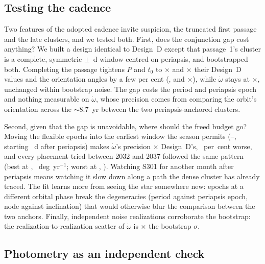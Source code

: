\documentclass{aastex701}
\begin{document}
\subsection{Testing the cadence}
\label{sec:cadencetests}

Two features of the adopted cadence invite suspicion, the truncated first passage and the late clusters, and we tested both. First, does the conjunction gap cost anything? We built a design identical to Design~D except that passage~1's cluster is a complete, symmetric $\pm$\campaignDenseHalfWidthDays{}~d window centred on periapsis, and bootstrapped both. Completing the passage tightens $P$ and $t_0$ to \cadenceCompleteRatioCapPYr{}$\times$ and \cadenceCompleteRatioTPeriYr{}$\times$ their Design~D values and the orientation angles by a few per cent (\cadenceCompleteRatioIDeg{}, \cadenceCompleteRatioCapOmegaDeg{} and \cadenceCompleteRatioOmegaDeg{}$\times$), while $\dot\omega$ stays at \cadenceCompleteRatioOmegaDot{}$\times$, unchanged within bootstrap noise. The gap costs the period and periapsis epoch and nothing measurable on $\dot\omega$, whose precision comes from comparing the orbit's orientation across the $\sim$8.7~yr between the two periapsis-anchored clusters.

Second, given that the gap is unavoidable, where should the freed budget go? Moving the \cadenceReallocateNMoved{} flexible epochs into the earliest window the season permits (\cadenceReallocateWindowStart{}--\cadenceReallocateWindowEnd{}, starting \conjunctionGapDaysAfterPeri{}~d after periapsis) makes $\dot\omega$'s precision \cadenceReallocateRatio{}$\times$ Design~D's, \cadenceReallocatePctChange{}~per~cent worse, and every placement tried between 2032 and 2037 followed the same pattern (best at \cadenceScanECenter{}, \cadenceScanESigmaOmegaDot{}~deg~yr$^{-1}$; worst at \cadenceScanCCenter{}, \cadenceScanCSigmaOmegaDot{}). Watching S301 for another month after periapsis means watching it slow down along a path the dense cluster has already traced. The fit learns more from seeing the star somewhere new: epochs at a different orbital phase break the degeneracies (period against periapsis epoch, node against inclination) that would otherwise blur the comparison between the two anchors. Finally, \cadenceMcNRealizations{} independent noise realizations corroborate the bootstrap: the realization-to-realization scatter of $\dot\omega$ is \cadenceMcOverBootOmegaDot{}$\times$ the bootstrap $\sigma$.

\subsection{Photometry as an independent check}
\label{sec:photometry}
\end{document}
